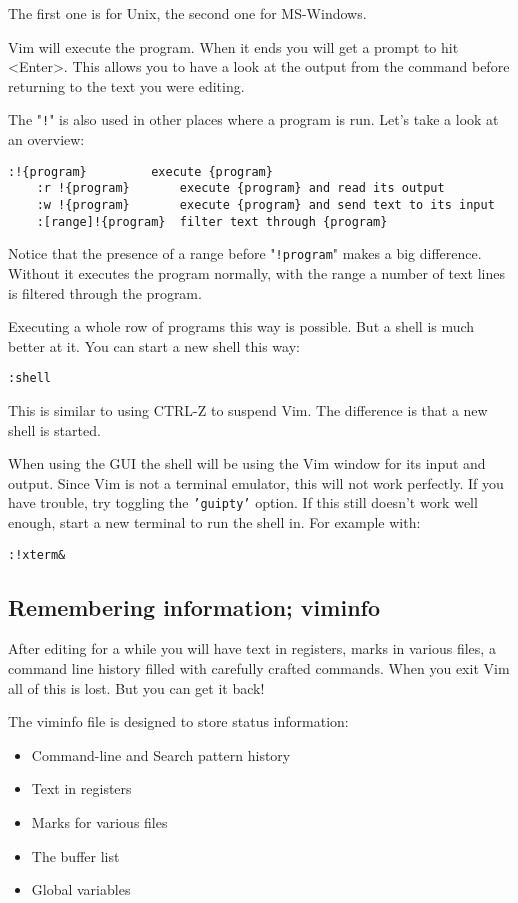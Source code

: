 The first one is for Unix, the second one for MS-Windows.

Vim will execute the program.
When it ends you will get a prompt to hit <Enter>.
This allows you to have a look at the output from the command before returning to the text you were editing.

The "\texttt{!}" is also used in other places where a program is run.
Let's take a look at an overview:

\begin{Verbatim}[samepage=true]
    :!{program}     	execute {program}
    :r !{program}      	execute {program} and read its output
    :w !{program}     	execute {program} and send text to its input
    :[range]!{program}  filter text through {program}
\end{Verbatim}

Notice that the presence of a range before "\texttt{!{program}}" makes a big difference.
Without it executes the program normally, with the range a number of text lines is filtered through the program.

Executing a whole row of programs this way is possible.
But a shell is much better at it.
You can start a new shell this way:

\begin{Verbatim}[samepage=true]
 :shell
\end{Verbatim}

This is similar to using CTRL-Z to suspend Vim.
The difference is that a new shell is started.

When using the GUI the shell will be using the Vim window for its input and output.
Since Vim is not a terminal emulator, this will not work perfectly.
If you have trouble, try toggling the \texttt{'guipty'} option.
If this still doesn't work well enough, start a new terminal to run the shell in.
For example with:

\begin{Verbatim}[samepage=true]
 :!xterm&
\end{Verbatim}
\subsection{Remembering information; viminfo}
After editing for a while you will have text in registers, marks in various files, a command line history filled with carefully crafted commands.
When you exit Vim all of this is lost.
But you can get it back!

The viminfo file is designed to store status information:
\begin{itemize}
\item Command-line and Search pattern history
\item Text in registers
\item Marks for various files
\item The buffer list
\item Global variables
\end{itemize}

